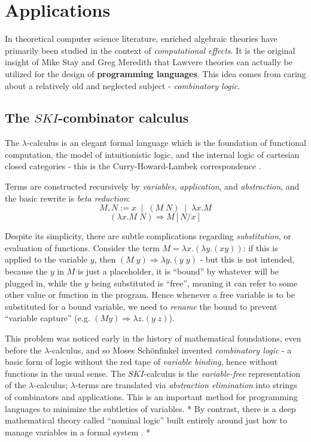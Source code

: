 \documentclass[a4paper,UKenglish]{article}
\theoremstyle{definition}
\begin{document}
\section{Applications}

In theoretical computer science literature, enriched algebraic theories have primarily been studied in the context of \textit{computational effects}. It is the original insight of Mike Stay and Greg Meredith \cite{ladl} that Lawvere theories can actually be utilized for the design of \textbf{programming languages}. This idea comes from caring about a relatively old and neglected subject - \textit{combinatory logic}.

\subsection{The $SKI$-combinator calculus}
The $\lambda$-calculus is an elegant formal language which is the foundation of functional computation, the model of intuitionistic logic, and the internal logic of cartesian closed categories - this is the Curry-Howard-Lambek correspondence \cite{rosetta}.

Terms are constructed recursively by \textit{variables}, \textit{application}, and \textit{abstraction}, and the basic rewrite is \textit{beta reduction}: $$M,N := x \;\; | \;\; (M\; N) \;\; | \;\; \lambda x.M$$ $$(\lambda x.M\; N) \Rightarrow M[N/x]$$

Despite its simplicity, there are subtle complications regarding \textit{substitution}, or evaluation of functions. Consider the term $M = \lambda x.(\lambda y.(xy))$: if this is applied to the variable $y$, then $(M\; y) \Rightarrow \lambda y.(y\; y)$ - but this is not intended, because the $y$ in $M$ is just a placeholder, it is ``bound'' by whatever will be plugged in, while the $y$ being substituted is ``free'', meaning it can refer to some other value or function in the program. Hence whenever a free variable is to be substituted for a bound variable, we need to \textit{rename} the bound to prevent ``variable capture'' (e.g. $(M y) \Rightarrow \lambda z.(y\; z)$).

This problem was noticed early in the history of mathematical foundations, even before the $\lambda$-calculus, and so Moses Sch\"onfinkel invented \textit{combinatory logic} \cite{combs} - a basic form of logic without the red tape of \textit{variable binding}, hence without functions in the usual sense. The $SKI$-calculus is the \textit{variable-free} representation of the $\lambda$-calculus; $\lambda$-terms are translated via \textit{abstraction elimination} into strings of combinators and applications. This is an important method for programming languages to minimize the subtleties of variables. * By contrast, there is a deep mathematical theory called ``nominal logic'' built entirely around just how to manage variables in a formal system \cite{nom}. *
\end{document}
